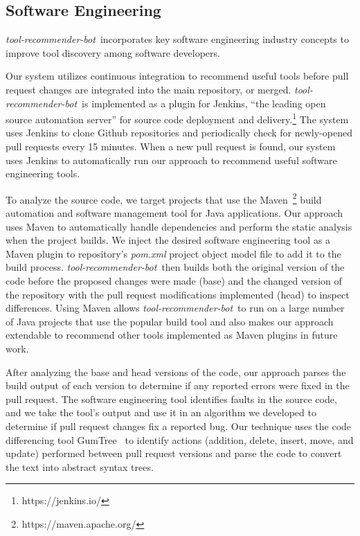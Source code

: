 \documentclass[conference]{IEEEtran}
\newcommand{\tool}{\textsl{tool-recommender-bot}}
\newcommand{\pseudosubsection}[1]{\vspace{2mm} \noindent{\it #1}}
\begin{document}
\subsection{Software Engineering}

\tool~incorporates key software engineering industry concepts to improve tool discovery among software developers.

\pseudosubsection{Continuous Integration}

Our system utilizes continuous integration to recommend useful tools before pull request changes are integrated into the main repository, or merged. \tool~is implemented as a plugin for Jenkins, ``the leading open source automation server'' for source code deployment and delivery.\footnote{https://jenkins.io/} The system uses Jenkins to clone Github repositories and periodically check for newly-opened pull requests every 15 minutes. When a new pull request is found, our system uses Jenkins to automatically run our approach to recommend useful software engineering tools.

To analyze the source code, we target projects that use the Maven~\footnote{https://maven.apache.org/} build automation and software management tool for Java applications. Our approach uses Maven to automatically handle dependencies and perform the static analysis when the project builds. We inject the desired software engineering tool as a Maven plugin to repository's \textit{pom.xml} project object model file to add it to the build process. \tool~then builds both the original version of the code before the proposed changes were made (base) and the changed version of the repository with the pull request modifications implemented (head) to inspect differences. Using Maven allows \tool~to run on a large number of Java projects that use the popular build tool and also makes our approach extendable to recommend other tools implemented as Maven plugins in future work. 

\pseudosubsection{Patch Identification}

After analyzing the base and head versions of the code, our approach parses the build output of each version to determine if any reported errors were fixed in the pull request. The software engineering tool identifies faults in the source code, and we take the tool's output and use it in an algorithm we developed to determine if pull request changes fix a reported bug. Our technique uses the code differencing tool GumTree~\cite{GumTree} to identify actions (addition, delete, insert, move, and update) performed between pull request versions and parse the code to convert the text into abstract syntax trees. 
\end{document}
